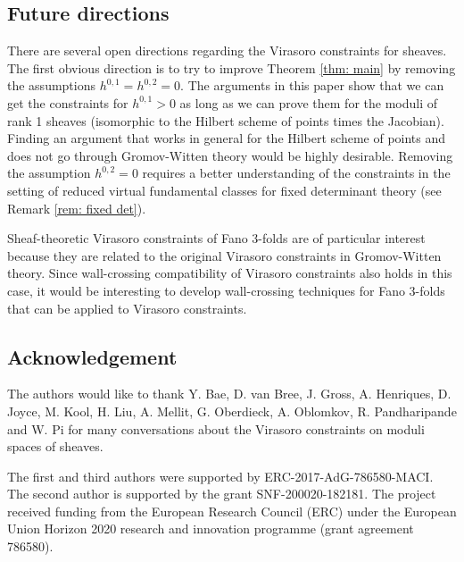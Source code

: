 \subsection{Future directions}
There are several open directions regarding the Virasoro constraints for sheaves. The first obvious direction is to try to improve Theorem \ref{thm: main} by removing the assumptions $h^{0,1}=h^{0,2}=0$. The arguments in this paper show that we can get the constraints for $h^{0,1}>0$ as long as we can prove them for the moduli of rank 1 sheaves (isomorphic to the Hilbert scheme of points times the Jacobian). Finding an argument that works in general for the Hilbert scheme of points and does not go through Gromov-Witten theory would be highly desirable. Removing the assumption $h^{0,2}=0$ requires a better understanding of the constraints in the setting of reduced virtual fundamental classes for fixed determinant theory (see Remark \ref{rem: fixed det}).

Sheaf-theoretic Virasoro constraints of Fano 3-folds are of particular interest because they are related to the original Virasoro constraints in Gromov-Witten theory. Since wall-crossing compatibility of Virasoro constraints also holds in this case, it would be interesting to develop wall-crossing techniques for Fano 3-folds that can be applied to Virasoro constraints.

\subsection{Acknowledgement}
The authors would like to thank Y. Bae, D. van Bree, J. Gross, A. Henriques, D. Joyce, M. Kool, H. Liu, A. Mellit,  G. Oberdieck, A. Oblomkov, R. Pandharipande and W. Pi for many conversations about the Virasoro constraints on moduli spaces of sheaves.

The first and third authors were supported by
ERC-2017-AdG-786580-MACI. The second author is supported by the grant SNF-200020-182181. The project received funding from the European Research Council (ERC) under the European Union Horizon 2020 research and innovation programme (grant agreement 786580).
